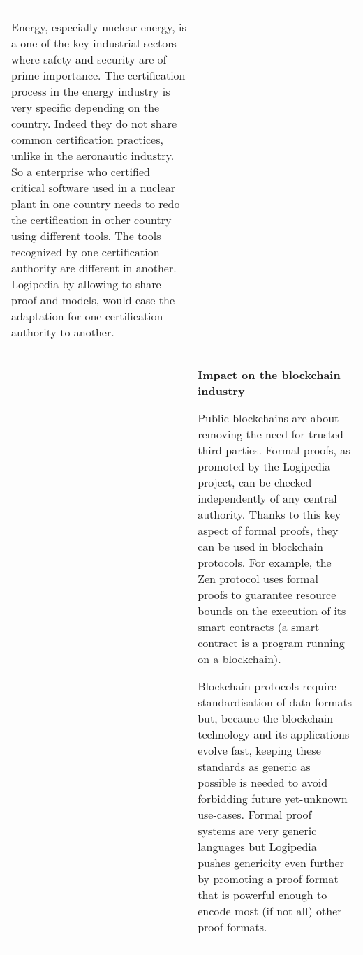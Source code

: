 \begin{longtable}{|p{}|p{}|}
\begin{shaded}
Energy, especially nuclear energy, is a one of the key industrial
sectors where safety and security are of prime importance.  The
certification process in the energy industry is very specific
depending on the country. Indeed they do not share common
certification practices, unlike in the aeronautic industry. So a
enterprise who certified critical software used in a nuclear plant in one
country needs to redo the certification in other country using
different tools. The tools recognized by one certification authority
are different in another.  Logipedia by allowing to share proof and
models, would ease the adaptation for one certification authority to
another.
\end{shaded}
\\
&
\definecolor{shadecolor}{named}{color1}
\begin{shaded}
{\bf\large Impact on the blockchain industry}

Public blockchains are about removing the need for trusted third
parties. Formal proofs, as promoted by the Logipedia project, can be
checked independently of any central authority. Thanks to this key
aspect of formal proofs, they can be used in blockchain protocols. For
example, the Zen protocol\cite{zenprotocol_whitepaper} uses formal
proofs to guarantee resource bounds on the execution of its smart
contracts (a smart contract is a program running on a blockchain).


\hspace{0.4cm}
Blockchain protocols require standardisation of data formats but,
because the blockchain technology and its applications evolve fast,
keeping these standards as generic as possible is needed to avoid
forbidding future yet-unknown use-cases. Formal proof systems are very
generic languages but Logipedia pushes genericity even further by
promoting a proof format that is powerful enough to encode most (if
not all) other proof formats.


\end{shaded}
\end{longtable}
